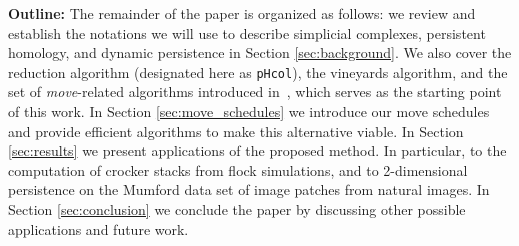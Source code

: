 \documentclass[sn-mathphys]{sn-jnl}
\newtheorem{proposition}{Proposition}
\begin{document}
\noindent 
\textbf{Outline:} The remainder of the paper is organized as follows: we review and establish the notations we will use to describe simplicial complexes, persistent homology, and dynamic persistence in Section \ref{sec:background}. 
We also cover the reduction algorithm (designated here as \texttt{pHcol}), the vineyards algorithm, and the set of \emph{move}-related algorithms introduced in~\cite{busaryev2010tracking}, which serves as the starting point of this work. 
In Section \ref{sec:move_schedules} we introduce our move schedules  and provide efficient algorithms to make this alternative viable. 
In Section \ref{sec:results} we present applications of the proposed method. 
In particular, to the computation of crocker stacks from flock simulations, and to 2-dimensional persistence on the Mumford data set of image patches from natural images. 
In Section \ref{sec:conclusion} we conclude the paper by discussing other possible applications and future work. 

\end{document}
